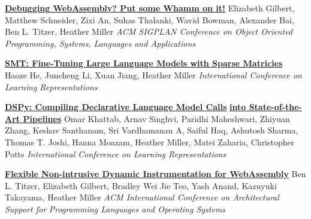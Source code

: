 \documentclass[9pt]{article}
\begin{document}
\bigskip

\noindent\href{https://www.arxiv.org/abs/2504.20192}{\bf Debugging WebAssembly? Put some Whamm on it!}
\newline\noindent Elizabeth Gilbert, Matthew Schneider, Zixi An, Suhas Thalanki,\vspace{-0.03in}  
\newline\noindent Wavid Bowman, Alexander Bai, Ben L. Titzer, Heather Miller
\newline\noindent\emph{ACM SIGPLAN Conference on Object Oriented Programming, Systems,}\vspace{-0.03in} 
\newline\noindent\emph{Languages and Applications}\vspace{-0.03in} 
\bigskip

\newpage

\noindent\href{https://openreview.net/forum?id=GbgCRJedQ7}{\bf SMT: Fine-Tuning Large Language Models with Sparse Matricies}\vspace{-0.03in}
\newline\noindent Haoze He, Juncheng Li, Xuan Jiang, Heather Miller
\newline\noindent\emph{International Conference on Learning Representations}
\bigskip

\noindent\href{https://openreview.net/forum?id=sY5N0zY5Od}{\bf DSPy: Compiling Declarative Language Model Calls}\vspace{-0.03in}
\newline\noindent\href{https://openreview.net/forum?id=sY5N0zY5Od}{\bf into State-of-the-Art Pipelines}
\newline\noindent Omar Khattab, Arnav Singhvi, Paridhi Maheshwari, Zhiyuan Zhang,\vspace{-0.03in} 
\newline\noindent Keshav Santhanam, Sri Vardhamanan A, Saiful Haq, Ashutosh Sharma,\vspace{-0.03in} 
\newline\noindent Thomas T. Joshi, Hanna Moazam, Heather Miller, Matei Zaharia, Christopher Potts
\newline\noindent\emph{International Conference on Learning Representations}
\bigskip

\noindent\href{https://dl.acm.org/doi/10.1145/3620666.3651338}{\bf Flexible Non-intrusive Dynamic Instrumentation for WebAssembly}
\newline\noindent Ben L. Titzer, Elizabeth Gilbert, Bradley Wei Jie Teo, Yash Anand,\vspace{-0.03in}
\newline\noindent Kazuyuki Takayama, Heather Miller
\newline\noindent\emph{ACM International Conference on Architectural Support for}\vspace{-0.03in} 
\newline\noindent\emph{Programming Languages and Operating Systems}
\bigskip
\end{document}
